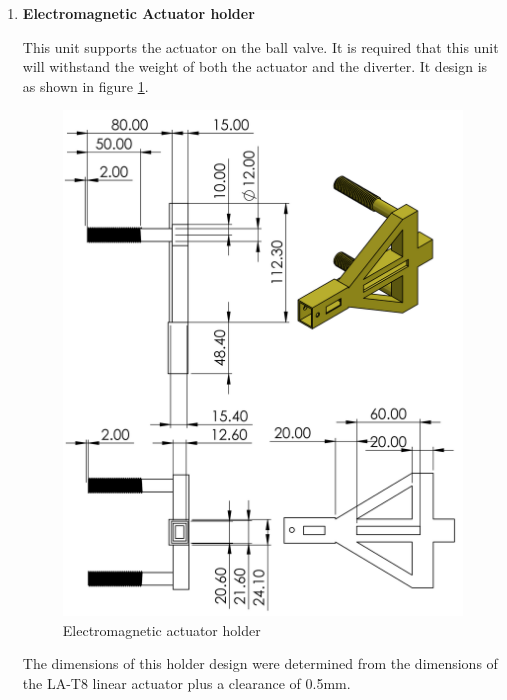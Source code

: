\begin{enumerate}
    \item \textbf{Electromagnetic Actuator holder}
    \par
    This unit supports the actuator on the ball valve. It is required that this unit will withstand the weight of both the actuator and the diverter. It design is as shown in figure \ref{fig:electromagnetic_actuator}.
    \begin{figure}[H]
        \centering
        \includegraphics[height=.5\textheight]{Figures/LA-T8Holder.PNG}
        \caption{Electromagnetic actuator holder}
        \label{fig:electromagnetic_actuator}
    \end{figure}
    The dimensions of this holder design were determined from the dimensions of the LA-T8 linear actuator plus a clearance of 0.5mm.
    

\end{enumerate}
